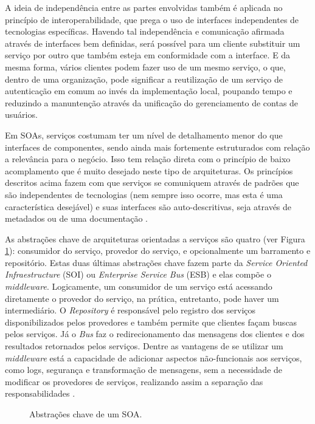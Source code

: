 \documentclass[diss]{template/setrem}
\begin{document}
A ideia de independência entre as partes envolvidas também é aplicada no princípio de interoperabilidade, que prega o uso de interfaces independentes de tecnologias específicas. Havendo tal independência e comunicação afirmada através de interfaces bem definidas, será possível para um cliente substituir um serviço por outro que também esteja em conformidade com a interface. E da mesma forma, vários clientes podem fazer uso de um mesmo serviço, o que, dentro de uma organização, pode significar a reutilização de um serviço de autenticação em comum ao invés da implementação local, poupando tempo e reduzindo a manuntenção através da unificação do gerenciamento de contas de usuários.

Em SOAs, serviços costumam ter um nível de detalhamento menor do que interfaces de componentes, sendo ainda mais fortemente estruturados com relação a relevância para o negócio. Isso tem relação direta com o princípio de baixo acomplamento que é muito desejado neste tipo de arquiteturas. Os princípios descritos acima fazem com que serviços se comuniquem através de padrões que são independentes de tecnologias (nem sempre isso ocorre, mas esta é uma característica desejável) e suas interfaces são auto-descritivas, seja através de metadados ou de uma documentação \citep{Vogel2011}.

As abstrações chave de arquiteturas orientadas a serviços são quatro (ver Figura \ref{fig:soa-key-abstractions}): consumidor do serviço, provedor do serviço, e opcionalmente um barramento e repositório. Estas duas últimas abstrações chave fazem parte da \emph{Service Oriented Infraestructure} (SOI) ou \emph{Enterprise Service Bus} (ESB) e elas compõe o \emph{middleware}. Logicamente, um consumidor de um serviço está acessando diretamente o provedor do serviço, na prática, entretanto, pode haver um intermediário. O \emph{Repository} é responsável pelo registro dos serviços disponibilizados pelos provedores e também permite que clientes façam buscas pelos serviços. Já o \emph{Bus} faz o redirecionamento das mensagens dos clientes e dos resultados retornados pelos serviços. Dentre as vantagens de se utilizar um \emph{middleware} está a capacidade de adicionar aspectos não-funcionais aos serviços, como logs, segurança e transformação de mensagens, sem a necessidade de modificar os provedores de serviços, realizando assim a separação das responsabilidades \citep{Vogel2011}.

\begin{figure}[!h]
    \caption{Abstrações chave de um SOA.}
    \label{fig:soa-key-abstractions}
\end{figure}
\end{document}
